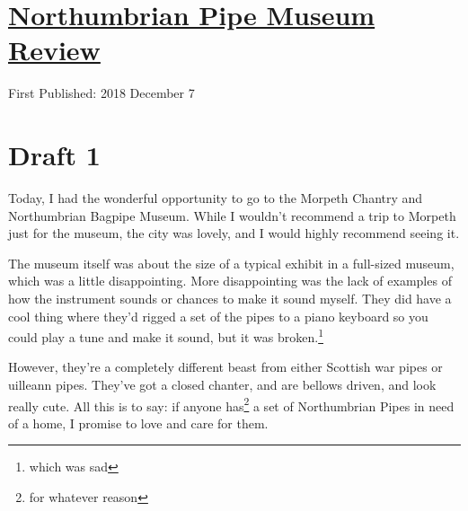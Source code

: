 \documentclass[12pt]{article}[titlepage]
\newcommand{\1}{\={a}}
\newcommand{\2}{\={e}}
\newcommand{\3}{\={\i}}
\newcommand{\4}{\=o}
\newcommand{\5}{\=u}
\newcommand{\6}{\={A}}
\renewcommand{\,}{\textsuperscript{,}}
\begin{document}
\doublespacing
\section{\href{northumbrian-pipe-museum.html}{Northumbrian Pipe Museum Review}}
First Published: 2018 December 7
\section{Draft 1}
Today, I had the wonderful opportunity to go to the Morpeth Chantry and Northumbrian Bagpipe Museum.
While I wouldn't recommend a trip to Morpeth just for the museum, the city was lovely, and I would highly recommend seeing it.

The museum itself was about the size of a typical exhibit in a full-sized museum, which was a little disappointing.
More disappointing was the lack of examples of how the instrument sounds or chances to make it sound myself.
They did have a cool thing where they'd rigged a set of the pipes to a piano keyboard so you could play a tune and make it sound, but it was broken.\footnote{which was sad}

However, they're a completely different beast from either Scottish war pipes or uilleann pipes.
They've got a closed chanter, and are bellows driven, and look really cute.
All this is to say: if anyone has\footnote{for whatever reason} a set of Northumbrian Pipes in need of a home, I promise to love and care for them.
\end{document}

